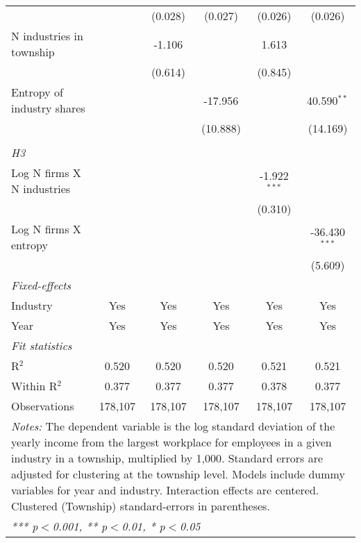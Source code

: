 \begin{tabular}{lccccc}
                                        &                  & (0.028)          & (0.027)          & (0.026)          & (0.026)\\   
   N industries in township             &                  & -1.106           &                  & 1.613            &   \\   
                                        &                  & (0.614)          &                  & (0.845)          &   \\   
   Entropy of industry shares           &                  &                  & -17.956          &                  & 40.590$^{**}$\\   
                                        &                  &                  & (10.888)         &                  & (14.169)\\   
\hdashline %
\\[0.1ex] %
\emph{H3} \\ 
   Log N firms X N industries           &                  &                  &                  & -1.922$^{***}$   &   \\   
                                        &                  &                  &                  & (0.310)          &   \\   
   Log N firms X entropy                &                  &                  &                  &                  & -36.430$^{***}$\\   
                                        &                  &                  &                  &                  & (5.609)\\   
   \midrule
   \emph{Fixed-effects}\\
   Industry                             & Yes              & Yes              & Yes              & Yes              & Yes\\  
   Year                                 & Yes              & Yes              & Yes              & Yes              & Yes\\  
   \midrule
   \emph{Fit statistics}\\
   R$^2$                                & 0.520            & 0.520            & 0.520            & 0.521            & 0.521\\  
   Within R$^2$                         & 0.377            & 0.377            & 0.377            & 0.378            & 0.377\\  
   Observations                         & 178,107          & 178,107          & 178,107          & 178,107          & 178,107\\  
   \midrule \midrule
\multicolumn{6}{p{16cm}}{\emph{Notes:} The dependent variable is the log 
    standard deviation of the yearly income from the largest workplace for 
    employees in a given industry in a township, multiplied by 1,000. Standard 
    errors are adjusted for clustering at the township level. Models include 
    dummy variables for year and industry. Interaction effects are centered. 
    Clustered (Township) standard-errors in parentheses.}\\
\multicolumn{6}{l}{\emph{*** p$<$0.001, ** p$<$0.01, * p$<$0.05}} \\ 
\end{tabular}
\par\endgroup
